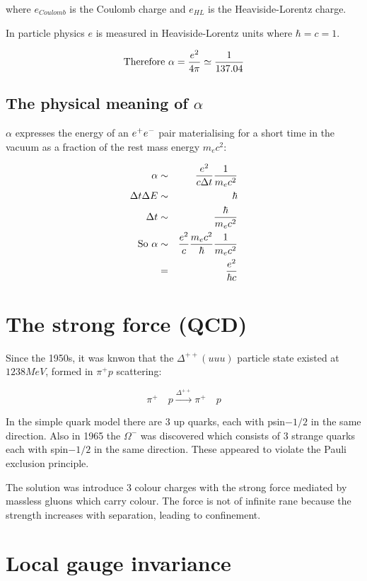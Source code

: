 where $e_{Coulomb}$ is the Coulomb charge and $e_{HL}$ is the Heaviside-Lorentz charge.

In particle physics $e$ is measured in Heaviside-Lorentz units where $\hbar = c = 1$.

\[
  \textrm{Therefore } \alpha = \frac{e^2}{4\pi} \simeq \frac{1}{137.04}
\]

\subsection{The physical meaning of \texorpdfstring{$\alpha$}{Alpha}}

$\alpha$ expresses the energy of an $e^+ e^- $ pair materialising for a short time in the vacuum as a fraction of the rest mass energy $m_e c^2$:

\begin{eqnarray*}
  \alpha & \sim & \frac{e^2}{c \Delta t}\frac{1}{m_e c^2} \\
  \Delta t \Delta E & \sim & \hbar \\
  \Delta t & \sim & \frac{\hbar}{m_e c^2} \\
  \textrm{So } \alpha & \sim & \frac{e^2}{c}\frac{m_e c^2}{\hbar}\frac{1}{m_e c^2} \\
  & = & \frac{e^2}{\hbar c}
\end{eqnarray*}

\section{The strong force (QCD)}

Since the 1950s, it was knwon that the $\Delta^{++}(uuu)$ particle state existed at $1238 MeV$, formed in $\pi^+ p$ scattering:

\[
  \pi^+ \quad p \stackrel{\Delta^{++}}{\to} \pi^+ \quad p
\]

In the simple quark model there are 3 up quarks, each with psin$-1/2$ in the same direction.  Also in 1965 the $\Omega^-$ was discovered which consists of 3 strange quarks each with spin$-1/2$ in the same direction.  These appeared to violate the Pauli exclusion principle.

The solution was introduce 3 colour charges with the strong force mediated by massless gluons which carry colour.  The force is not of infinite rane because the strength increases with separation, leading to confinement.

\section{Local gauge invariance}

